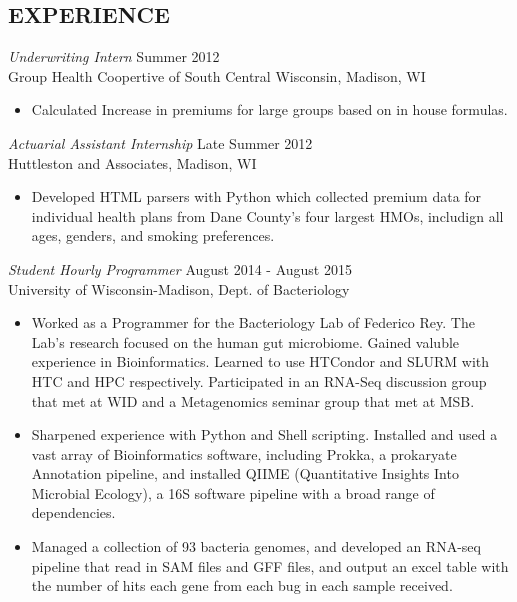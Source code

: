 \documentclass[margin]{res}
\begin{document}
\begin{resume}
 \section{EXPERIENCE} {\sl Underwriting Intern} \hfill Summer 2012 \\
 Group Health Coopertive of South Central Wisconsin,
 Madison, WI
 \begin{itemize}  \itemsep -2pt %
  \item Calculated Increase in premiums for large groups based on in house formulas.
 \end{itemize}

 {\sl Actuarial Assistant Internship} \hfill            Late Summer 2012 \\
 Huttleston and Associates, Madison, WI
 \begin{itemize}  \itemsep -2pt %
  \item Developed HTML parsers with Python which collected premium data for individual health plans from Dane County's four largest HMOs, includign all ages, genders, and smoking preferences.
 \end{itemize}

 {\sl Student Hourly Programmer} \hfill August 2014 - August 2015\\
 University of Wisconsin-Madison, Dept. of Bacteriology
 \begin{itemize}  \itemsep -2pt
  \item Worked as a Programmer for the Bacteriology Lab of Federico Rey. The Lab's research focused on the human gut microbiome. Gained valuble experience in Bioinformatics. Learned to use HTCondor and SLURM with HTC and HPC respectively. Participated in an RNA-Seq discussion group that met at WID and a Metagenomics seminar group that met at MSB.
  \item Sharpened experience with Python and Shell scripting. Installed and used a vast array of Bioinformatics software, including Prokka, a prokaryate Annotation pipeline, and installed QIIME (Quantitative Insights Into Microbial Ecology), a 16S software pipeline with a broad range of dependencies.
  \item Managed a collection of 93 bacteria genomes, and developed an RNA-seq pipeline that read in SAM files and GFF files, and output an excel table with the number of hits each gene from each bug in each sample received.
 \end{itemize}


\end{resume}
\end{document}
